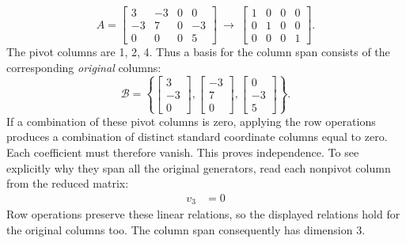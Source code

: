 \[A=\left[\begin{array}{rrrr}3&-3&0&0\\-3&7&0&-3\\0&0&0&5\end{array}\right]\ \longrightarrow\ \left[\begin{array}{rrrr}1&0&0&0\\0&1&0&0\\0&0&0&1\end{array}\right].\]
The pivot columns are 1, 2, 4. Thus a basis for the column span consists of the corresponding \emph{original} columns:
\[\mathcal B=\left\{\left[\begin{array}{r}3\\-3\\0\end{array}\right],\left[\begin{array}{r}-3\\7\\0\end{array}\right],\left[\begin{array}{r}0\\-3\\5\end{array}\right]\right\}.\]
If a combination of these pivot columns is zero, applying the row operations produces a combination of distinct standard coordinate columns equal to zero. Each coefficient must therefore vanish. This proves independence. To see explicitly why they span all the original generators, read each nonpivot column from the reduced matrix:
\[\begin{aligned}v_{3}&=0\end{aligned}\]
Row operations preserve these linear relations, so the displayed relations hold for the original columns too. The column span consequently has dimension $3$.

